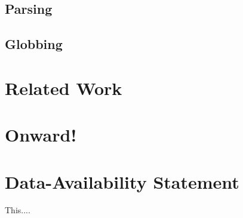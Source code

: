 \documentclass[acmsmall,review,anonymous]{acmart}
\begin{document}
\subsection{Parsing}

\subsection{Globbing}

\section{Related Work}

\section{Onward!}

\section*{Data-Availability Statement}
This....





\end{document}
